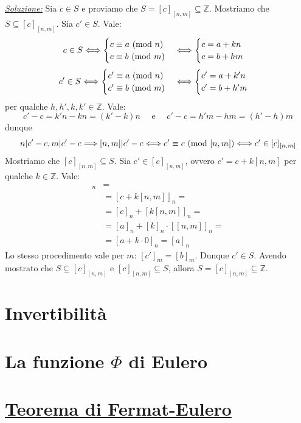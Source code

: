 \documentclass[oneside]{book}
\begin{document}
\begin{tcolorbox}[enhanced, breakable, title={Teolema cinese del lesto}]
\underline{\emph{Soluzione:}} Sia $c \in S$ e proviamo che $S=[c]_{[n,m]} \subseteq \mathbb{Z}$.
Mostriamo che $S \subseteq [c]_{[n,m]}$. Sia $c'\in S$. Vale:
\[ c \in S \Longleftrightarrow
    \begin{cases}
        c \equiv a \ (\mathrm{mod}\ n)\\
        c \equiv b \ (\mathrm{mod}\ m)
    \end{cases}
    \Longleftrightarrow
    \begin{cases}
        c = a+kn\\
        c = b+hm
    \end{cases}
\]
\[
    c' \in S \Longleftrightarrow
    \begin{cases}
        c' \equiv a \ (\mathrm{mod}\ n)\\
        c' \equiv b \ (\mathrm{mod}\ m)
    \end{cases}
    \Longleftrightarrow
    \begin{cases}
        c' = a+k'n\\
        c' = b+h'm
    \end{cases}
\]
per qualche $h,h',k,k' \in \mathbb{Z}$. Vale:
\[ c'-c=k'n-kn=(k'-k)n \quad\text{ e }\quad c'-c=h'm-hm=(h'-h)m \]
dunque
\[ n|c'-c,m|c'-c \Longrightarrow [n,m]|c'-c \Longleftrightarrow c'\equiv c \ (\mathrm{mod}\ [n,m]) \Longleftrightarrow c' \in [c]_{[n,m]} \]
Mostriamo che $[c]_{[n,m]} \subseteq S$. Sia $c' \in [c]_{[n,m]}$, ovvero $c'=c+k[n,m]$ per qualche
$k \in \mathbb{Z}$. Vale:
\begin{align*}
    [c']_n &=\\
    &= [c+k[n,m]]_n =\\
    &= [c]_n + [k[n,m]]_n =\\
    &= [a]_n + [k]_n \cdot [[n,m]]_n =\\
    &= [a+k\cdot 0]_n = [a]_n
\end{align*}
Lo stesso procedimento vale per $m$: $[c']_m = [b]_m$. Dunque $c'\in S$.
Avendo mostrato che $S\subseteq[c]_{[n,m]}$ e $[c]_{[n,m]}\subseteq S$,
allora $S = [c]_{[n,m]}\subseteq\mathbb{Z}$.
\cvd
\end{tcolorbox}

\section{Invertibilità}
\section{La funzione $\Phi$ di Eulero}
\section{\underline{Teorema di Fermat-Eulero}}
\end{document}
